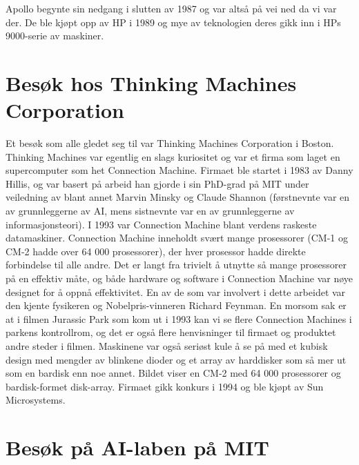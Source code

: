 \documentclass[../../main.tex]{subfiles}
\begin{document}
Apollo begynte sin nedgang i slutten av 1987 og var altså på vei ned da vi var der. De ble kjøpt opp av HP i 1989 og mye av teknologien deres gikk inn i HPs 9000-serie av maskiner.

\section{Besøk hos Thinking Machines Corporation}

Et besøk som alle gledet seg til var Thinking Machines Corporation i Boston. Thinking Machines var egentlig en slags kuriositet og var et firma som laget en supercomputer som het Connection Machine. Firmaet ble startet i 1983 av Danny Hillis, og var basert på arbeid han gjorde i sin PhD-grad på MIT under veiledning av blant annet Marvin Minsky og Claude Shannon (førstnevnte var en av grunnleggerne av AI, mens sistnevnte var en av grunnleggerne av informasjonsteori). I 1993 var Connection Machine blant verdens raskeste datamaskiner. Connection Machine inneholdt svært mange prosessorer (CM-1 og CM-2 hadde over 64 000 prosessorer), der hver prosessor hadde direkte forbindelse til alle andre. Det er langt fra trivielt å utnytte så mange prosessorer på en effektiv måte, og både hardware og software i Connection Machine var nøye designet for å oppnå effektivitet. En av de som var involvert i dette arbeidet var den kjente fysikeren og Nobelpris-vinneren Richard Feynman. En morsom sak er at i filmen Jurassic Park som kom ut i 1993 kan vi se flere Connection Machines i parkens kontrollrom, og det er også flere henvisninger til firmaet og produktet andre steder i filmen. Maskinene var også seriøst kule å se på med et kubisk design med mengder av blinkene dioder og et array av harddisker som så mer ut som en bardisk enn noe annet. Bildet viser en CM-2 med 64 000 prosessorer og bardisk-formet disk-array. Firmaet gikk konkurs i 1994 og ble kjøpt av Sun Microsystems. 

\section{Besøk på AI-laben på MIT}
\end{document}
